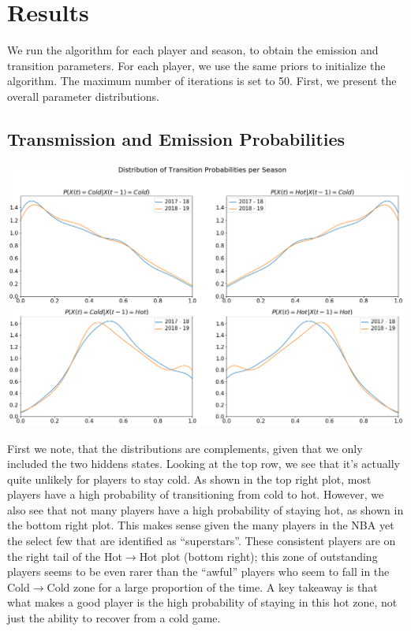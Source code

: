 \documentclass[12pt, authoryear]{elsarticle}
\begin{document}
\newpage

\section{Results}\label{results}

We run the algorithm for each player and season, to obtain the emission and transition parameters. For each player, we use the same priors to initialize the algorithm. The maximum number of iterations is set to 50.  First, we present the overall parameter distributions.

\subsection{Transmission and Emission Probabilities}

\includegraphics[scale=0.4]{2distoftransition_probs_perseason}

First we note, that the distributions are complements, given that we only included the two hiddens states. Looking at the top row, we see that it's actually quite unlikely for players to stay cold. As shown in the top right plot, most players have a high probability of transitioning from cold to hot. However, we also see that not many players have a high probability of staying hot, as shown in the bottom right plot. This makes sense given the many players in the NBA yet the select few that are identified as “superstars”. These consistent players are on the right tail of the Hot$\rightarrow$Hot plot (bottom right); this zone of outstanding players seems to be even rarer than the “awful” players who seem to fall in the Cold$\rightarrow$Cold zone for a large proportion of the time. A key takeaway is that what makes a good player is the high probability of staying in this hot zone, not just the ability to recover from a cold game.
\end{document}
